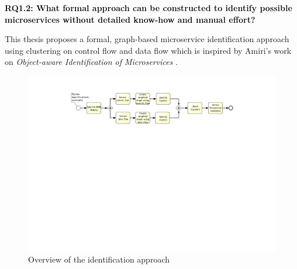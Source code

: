 \vspace{0.5cm}
\par
\begingroup
\leftskip=1cm
\rightskip=1cm

\noindent
\textbf{RQ1.2: What formal approach can be constructed to identify possible microservices without detailed know-how and manual effort? }

\endgroup
\vspace{0.5cm}

\noindent
This thesis proposes a formal, graph-based microservice identification approach using clustering on control flow and data flow which is  inspired by Amiri’s work on \textit{Object-aware Identification of Microservices} \cite{ObjectAwareAmiri}. \\



\begin{figure}[h!]
	\includegraphics[width=\textwidth, trim={7.5cm 15.3cm 5.0cm 1.5cm}]{img/ThesisProcess.pdf}
	\caption{Overview of the identification approach}
	\label{fig:thesisProcess}
\end{figure}


